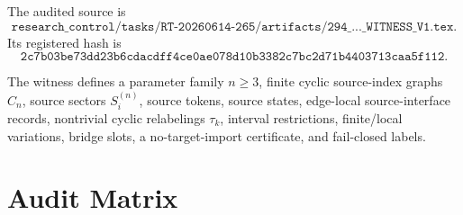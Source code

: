 \documentclass[11pt]{article}
\begin{document}
The audited source is
\[
\texttt{research\_control/tasks/RT-20260614-265/artifacts/294\_...\_WITNESS\_V1.tex}.
\]
Its registered hash is
\[
\texttt{2c7b03be73dd23b6cdacdff4ce0ae078d10b3382c7bc2d71b4403713caa5f112}.
\]

The witness defines a parameter family \(n\ge 3\), finite cyclic
source-index graphs \(C_n\), source sectors \(S_i^{(n)}\), source tokens,
source states, edge-local source-interface records, nontrivial cyclic
relabelings \(\tau_k\), interval restrictions, finite/local variations,
bridge slots, a no-target-import certificate, and fail-closed labels.

\section{Audit Matrix}
\end{document}
